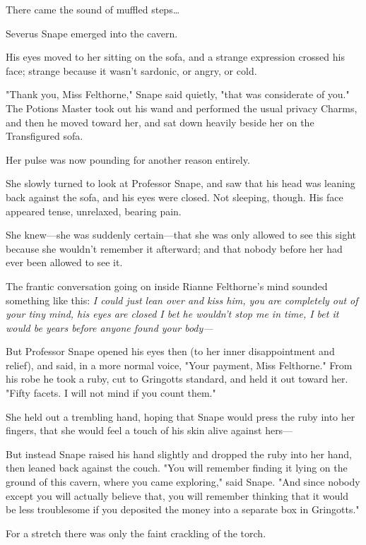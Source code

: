 There came the sound of muffled steps{\ldots}

Severus Snape emerged into the cavern.

His eyes moved to her sitting on the sofa, and a strange expression crossed his 
face; strange because it wasn't sardonic, or angry, or cold.

"Thank you, Miss Felthorne," Snape said quietly, "that was considerate of you." 
The Potions Master took out his wand and performed the usual privacy Charms, 
and then he moved toward her, and sat down heavily beside her on the 
Transfigured sofa.

Her pulse was now pounding for another reason entirely.

She slowly turned to look at Professor Snape, and saw that his head was leaning 
back against the sofa, and his eyes were closed. Not sleeping, though. His face 
appeared tense, unrelaxed, bearing pain.

She knew---she was suddenly certain---that she was only allowed to see this 
sight because she wouldn't remember it afterward; and that nobody before her 
had ever been allowed to see it.

The frantic conversation going on inside Rianne Felthorne's mind sounded 
something like this: \emph{I could just lean over and kiss him, you are 
completely out of your tiny mind, his eyes are closed I bet he wouldn't stop me 
in time, I bet it would be years before anyone found your body---}

But Professor Snape opened his eyes then (to her inner disappointment and 
relief), and said, in a more normal voice, "Your payment, Miss Felthorne." From 
his robe he took a ruby, cut to Gringotts standard, and held it out toward her. 
"Fifty facets. I will not mind if you count them."

She held out a trembling hand, hoping that Snape would press the ruby into her 
fingers, that she would feel a touch of his skin alive against hers---

But instead Snape raised his hand slightly and dropped the ruby into her hand, 
then leaned back against the couch. "You will remember finding it lying on the 
ground of this cavern, where you came exploring," said Snape. "And since nobody 
except you will actually believe that, you will remember thinking that it would 
be less troublesome if you deposited the money into a separate box in 
Gringotts."

For a stretch there was only the faint crackling of the torch.

